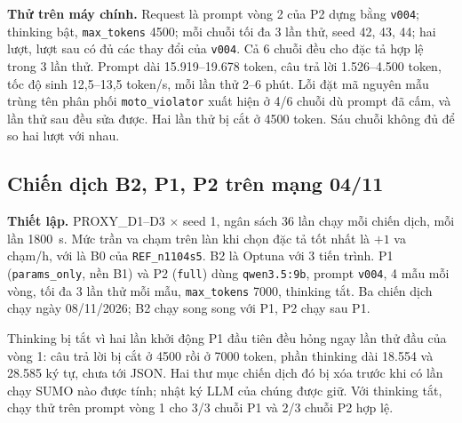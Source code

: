 \documentclass[../main.tex]{subfiles}
\begin{document}
\textbf{Thử trên máy chính.} Request là prompt vòng 2 của P2 dựng bằng \texttt{v004}; thinking bật, \texttt{max\_tokens} 4500; mỗi chuỗi tối đa 3 lần thử, seed 42, 43, 44; hai lượt, lượt sau có đủ các thay đổi của \texttt{v004}. Cả 6 chuỗi đều cho đặc tả hợp lệ trong 3 lần thử. Prompt dài 15.919--19.678 token, câu trả lời 1.526--4.500 token, tốc độ sinh 12,5--13,5 token/s, mỗi lần thử 2--6 phút. Lỗi đặt mã nguyên mẫu trùng tên phân phối \texttt{moto\_violator} xuất hiện ở 4/6 chuỗi dù prompt đã cấm, và lần thử sau đều sửa được. Hai lần thử bị cắt ở 4500 token. Sáu chuỗi không đủ để so hai lượt với nhau.

\subsection{Chiến dịch B2, P1, P2 trên mạng 04/11}
\label{subsection:campaigns_n1108}

\textbf{Thiết lập.} PROXY\_D1--D3 $\times$ seed 1, ngân sách 36 lần chạy mỗi chiến dịch, mỗi lần 1800~s. Mức trần va chạm trên làn khi chọn đặc tả tốt nhất là  $+ 1$ va chạm/h, với  là B0 của \texttt{REF\_n1104s5}. B2 là Optuna với 3 tiến trình. P1 (\texttt{params\_only}, nền B1) và P2 (\texttt{full}) dùng \texttt{qwen3.5:9b}, prompt \texttt{v004}, 4 mẫu mỗi vòng, tối đa 3 lần thử mỗi mẫu, \texttt{max\_tokens} 7000, thinking tắt. Ba chiến dịch chạy ngày 08/11/2026; B2 chạy song song với P1, P2 chạy sau P1.

Thinking bị tắt vì hai lần khởi động P1 đầu tiên đều hỏng ngay lần thử đầu của vòng 1: câu trả lời bị cắt ở 4500 rồi ở 7000 token, phần thinking dài 18.554 và 28.585 ký tự, chưa tới JSON. Hai thư mục chiến dịch đó bị xóa trước khi có lần chạy SUMO nào được tính; nhật ký LLM của chúng được giữ. Với thinking tắt, chạy thử trên prompt vòng 1 cho 3/3 chuỗi P1 và 2/3 chuỗi P2 hợp lệ.
\end{document}
